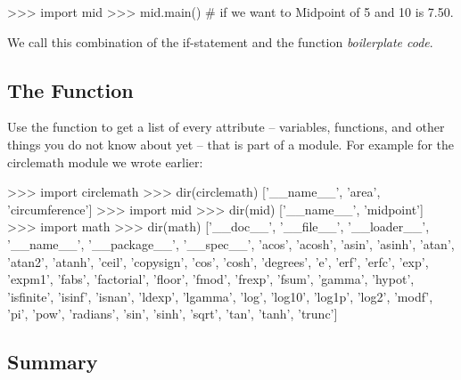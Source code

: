 \documentclass[11pt]{cselabheader}
\begin{document}
\begin{pyconcode}
>>> import mid
>>> mid.main() # if we want to
Midpoint of 5 and 10 is 7.50.
\end{pyconcode}


We call this combination of the if-statement and the
 function \emph{boilerplate code}.

\subsection{The \protect{} Function}

Use the  function to get a list of every attribute --
variables, functions, and other things you do not know about yet -- that is part
of a module. For example for the circlemath module we wrote earlier:

\begin{pyconcode}
>>> import circlemath
>>> dir(circlemath)
['__name__', 'area', 'circumference']
>>> import mid
>>> dir(mid)
['__name__', 'midpoint']
>>> import math
>>> dir(math)
['__doc__', '__file__', '__loader__', '__name__', '__package__', '__spec__', 'acos',
'acosh', 'asin', 'asinh', 'atan', 'atan2', 'atanh', 'ceil', 'copysign', 'cos', 'cosh',
'degrees', 'e', 'erf', 'erfc', 'exp', 'expm1', 'fabs', 'factorial', 'floor', 'fmod',
'frexp', 'fsum', 'gamma', 'hypot', 'isfinite', 'isinf', 'isnan', 'ldexp', 'lgamma',
'log', 'log10', 'log1p', 'log2', 'modf', 'pi', 'pow', 'radians', 'sin', 'sinh', 'sqrt',
'tan', 'tanh', 'trunc']
\end{pyconcode}

\subsection{Summary}
\label{subsec:modules.sum}
\end{document}
